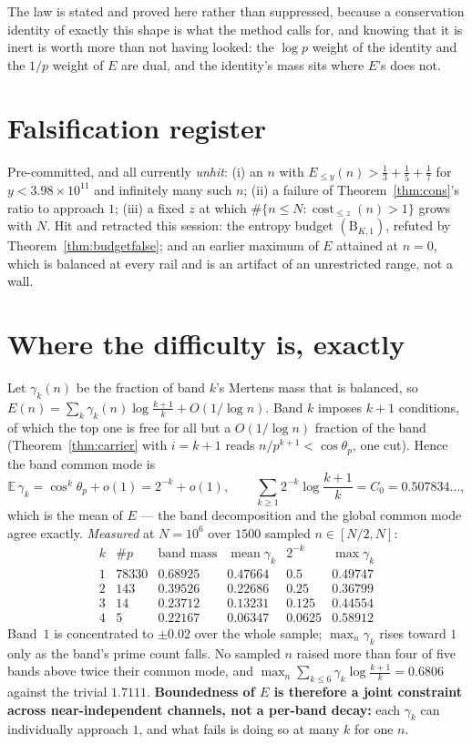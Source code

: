 \documentclass[11pt]{article}
\begin{document}
The law is stated and proved here rather than suppressed, because a
conservation identity of exactly this shape is what the method calls for, and
knowing that it is inert is worth more than not having looked: the $\log p$
weight of the identity and the $1/p$ weight of $E$ are dual, and the identity's
mass sits where $E$'s does not.

\section{Falsification register}

Pre-committed, and all currently \emph{unhit}: (i) an $n$ with
$E_{\le y}(n)>\frac13+\frac15+\frac17$ for $y<3.98\times10^{11}$ and infinitely
many such $n$; (ii) a failure of Theorem~\ref{thm:cons}'s ratio to approach $1$;
(iii) a fixed $z$ at which $\#\{n\le N:\operatorname{cost}_{\le z}(n)>1\}$ grows
with $N$.  Hit and retracted this session: the entropy budget
$(\mathrm B_{K,1})$, refuted by Theorem~\ref{thm:budgetfalse}; and an earlier
maximum of $E$ attained at $n=0$, which is balanced at every rail and is an
artifact of an unrestricted range, not a wall.

\section{Where the difficulty is, exactly}

Let $\gamma_k(n)$ be the fraction of band $k$'s Mertens mass that is balanced,
so $E(n)=\sum_k\gamma_k(n)\log\frac{k+1}{k}+O(1/\log n)$.  Band $k$ imposes
$k+1$ conditions, of which the top one is free for all but a $O(1/\log n)$
fraction of the band (Theorem~\ref{thm:carrier} with $i=k+1$ reads
$n/p^{k+1}<\cos\theta_p$, one cut).  Hence the band common mode is
\[
  \mathbb E\,\gamma_k=\cos^{k}\theta_p+o(1)=2^{-k}+o(1),
  \qquad
  \sum_{k\ge1}2^{-k}\log\frac{k+1}{k}=C_0=0.507834\ldots,
\]
which is the mean of $E$ --- the band decomposition and the global common mode
agree exactly.  \emph{Measured} at $N=10^6$ over $1500$ sampled
$n\in[N/2,N]$:
\[
\begin{array}{r|rrrrr}
 k & \#p & \text{band mass} & \operatorname{mean}\gamma_k & 2^{-k} & \max\gamma_k\\\hline
 1 & 78330 & 0.68925 & 0.47664 & 0.5 & 0.49747\\
 2 & 143 & 0.39526 & 0.22686 & 0.25 & 0.36799\\
 3 & 14 & 0.23712 & 0.13231 & 0.125 & 0.44554\\
 4 & 5 & 0.22167 & 0.06347 & 0.0625 & 0.58912
\end{array}
\]
Band~$1$ is concentrated to $\pm0.02$ over the whole sample; $\max_n\gamma_k$
rises toward $1$ only as the band's prime count falls.  No sampled $n$ raised
more than four of five bands above twice their common mode, and
$\max_n\sum_{k\le6}\gamma_k\log\frac{k+1}{k}=0.6806$ against the trivial
$1.7111$.  \textbf{Boundedness of $E$ is therefore a joint constraint across
near-independent channels, not a per-band decay:} each $\gamma_k$ can
individually approach $1$, and what fails is doing so at many $k$ for one $n$.
\end{document}
